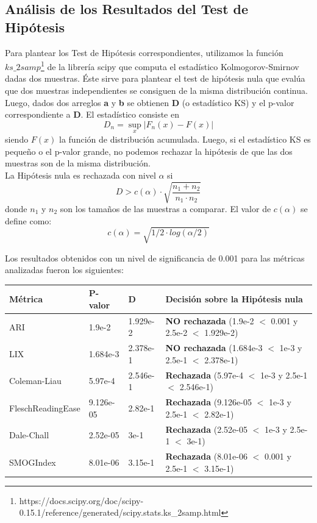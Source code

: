 \documentclass[12pt,journal,compsoc]{IEEEtran}
\begin{document}
\subsection{Análisis de los Resultados del Test de Hipótesis}

Para plantear los Test de Hipótesis correspondientes, utilizamos la función $ks\_2samp$\footnote{https://docs.scipy.org/doc/scipy-0.15.1/reference/generated/scipy.stats.ks\_2samp.html} de la librería scipy que computa el estadístico Kolmogorov-Smirnov dadas dos muestras. Éste sirve para plantear el test de hipótesis nula que evalúa que dos muestras independientes se consiguen de la misma distribución continua.\\

Luego, dados dos arreglos \textbf{a} y \textbf{b} se obtienen \textbf{D} (o estadístico KS) y el p-valor correspondiente a \textbf{D}. El estadístico consiste en
$$D_{n}=\sup_{x}|F_{n}(x)-F(x)|$$
siendo $F(x)$ la función de distribución acumulada. Luego, si el estadístico KS es pequeño o el p-valor grande, no podemos rechazar la hipótesis de que las dos muestras son de la misma distribución.\\

La Hipótesis nula es rechazada con nivel $\alpha$ si $$D > c(\alpha) \cdot \sqrt{\frac{n_1+n_2}{n_1\cdot n_2}}$$ donde $n_1$ y $n_2$ son los tamaños de las muestras a comparar. El valor de $c(\alpha)$ se define como:
$$c(\alpha) = \sqrt{1/2\cdot log(\alpha/2)}$$

Los resultados obtenidos con un nivel de significancia de 0.001 para las métricas analizadas fueron los siguientes:\\

\begin{tabular}{ | l | l | l | l | }
\hline
Métrica & P-valor & D & Decisión sobre la Hipótesis nula\\
\hline
ARI & 1.9e-2 & 1.929e-2 & \textbf{NO rechazada} (1.9e-2 $<$ 0.001 y 2.5e-2 $<$ 1.929e-2)\\
\hline
LIX & 1.684e-3 & 2.378e-1 & \textbf{NO rechazada} (1.684e-3 $<$ 1e-3 y 2.5e-1 $<$ 2.378e-1)\\
\hline
Coleman-Liau & 5.97e-4 & 2.546e-1 & \textbf{Rechazada} (5.97e-4 $<$ 1e-3 y 2.5e-1 $<$ 2.546e-1)\\
\hline
FleschReadingEase & 9.126e-05 & 2.82e-1 & \textbf{Rechazada} (9.126e-05 $<$ 1e-3 y 2.5e-1 $<$ 2.82e-1)\\
\hline
Dale-Chall & 2.52e-05 & 3e-1 & \textbf{Rechazada} (2.52e-05 $<$ 1e-3 y 2.5e-1 $<$ 3e-1)\\
\hline
SMOGIndex & 8.01e-06 & 3.15e-1 & \textbf{Rechazada} (8.01e-06 $<$ 0.001 y 2.5e-1 $<$ 3.15e-1)\\
\hline
\end{tabular}
\end{document}

